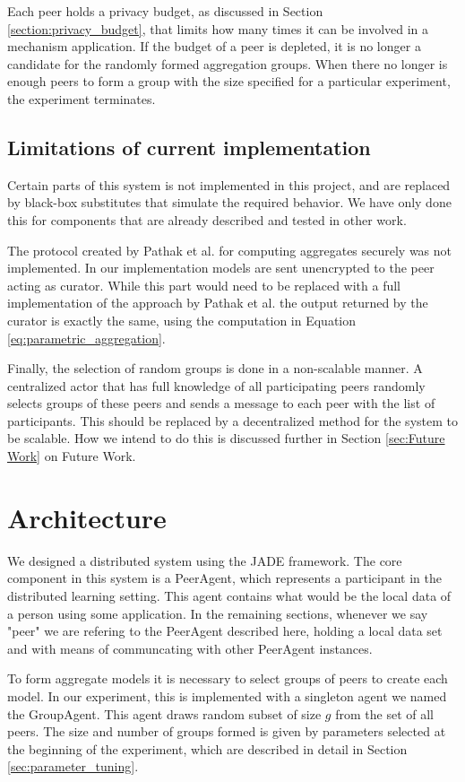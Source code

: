 Each peer holds a privacy budget, as discussed in Section \ref{section:privacy_budget}, that limits how many times it can be involved in a mechanism application. If the budget of a peer is depleted, it is no longer a candidate for the randomly formed aggregation groups. When there no longer is enough peers to form a group with the size specified for a particular experiment, the experiment terminates.

\subsection{Limitations of current implementation}

Certain parts of this system is not implemented in this project, and are replaced by black-box substitutes that simulate the required behavior. We have only done this for components that are already described and tested in other work. 

The protocol created by Pathak et al. for computing aggregates securely was not implemented. In our implementation models are sent unencrypted to the peer acting as curator. While this part would need to be replaced with a full implementation of the approach by Pathak et al. the output returned by the curator is exactly the same, using the computation in Equation \ref{eq:parametric_aggregation}. 

Finally, the selection of random groups is done in a non-scalable manner. A centralized actor that has full knowledge of all participating peers randomly selects groups of these peers and sends a message to each peer with the list of participants. This should be replaced by a decentralized method for the system to be scalable. How we intend to do this is discussed further in Section \ref{sec:Future Work} on Future Work.


\section{Architecture}

We designed a distributed system using the JADE framework. The core component in this system is a PeerAgent, which represents a participant in the distributed learning setting. This agent contains what would be the local data of a person using some application. In the remaining sections, whenever we say "peer" we are refering to the PeerAgent described here, holding a local data set and with means of communcating with other PeerAgent instances.

To form aggregate models it is necessary to select groups of peers to create each model. In our experiment, this is implemented with a singleton agent we named the GroupAgent. This agent draws random subset of size $g$ from the set of all peers. The size and number of groups formed is given by parameters selected at the beginning of the experiment, which are described in detail in Section \ref{sec:parameter_tuning}. 

